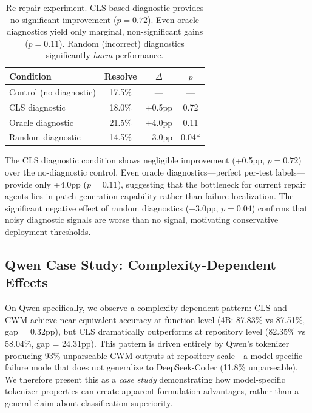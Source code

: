 \documentclass[11pt,a4paper]{article}
\begin{document}
\begin{table}[t]
\centering
\small
\begin{tabular}{lccc}
\toprule
\textbf{Condition} & \textbf{Resolve} & \textbf{$\Delta$} & \textbf{$p$} \\
\midrule
Control (no diagnostic) & 17.5\% & --- & --- \\
CLS diagnostic & 18.0\% & +0.5pp & 0.72 \\
Oracle diagnostic & 21.5\% & +4.0pp & 0.11 \\
Random diagnostic & 14.5\% & $-$3.0pp & 0.04* \\
\bottomrule
\end{tabular}
\caption{Re-repair experiment. CLS-based diagnostic provides no significant improvement ($p=0.72$). Even oracle diagnostics yield only marginal, non-significant gains ($p=0.11$). Random (incorrect) diagnostics significantly \emph{harm} performance.}
\label{tab:rerepair}
\end{table}

The CLS diagnostic condition shows negligible improvement (+0.5pp, $p=0.72$) over the no-diagnostic control. Even oracle diagnostics---perfect per-test labels---provide only +4.0pp ($p=0.11$), suggesting that the bottleneck for current repair agents lies in patch generation capability rather than failure localization. The significant negative effect of random diagnostics ($-$3.0pp, $p=0.04$) confirms that noisy diagnostic signals are worse than no signal, motivating conservative deployment thresholds.

\subsection{Qwen Case Study: Complexity-Dependent Effects}
\label{sec:qwen}

On Qwen specifically, we observe a complexity-dependent pattern: CLS and CWM achieve near-equivalent accuracy at function level (4B: 87.83\% vs 87.51\%, gap = 0.32pp), but CLS dramatically outperforms at repository level (82.35\% vs 58.04\%, gap = 24.31pp). This pattern is driven entirely by Qwen's tokenizer producing 93\% unparseable CWM outputs at repository scale---a model-specific failure mode that does not generalize to DeepSeek-Coder (11.8\% unparseable). We therefore present this as a \emph{case study} demonstrating how model-specific tokenizer properties can create apparent formulation advantages, rather than a general claim about classification superiority.

\end{document}
